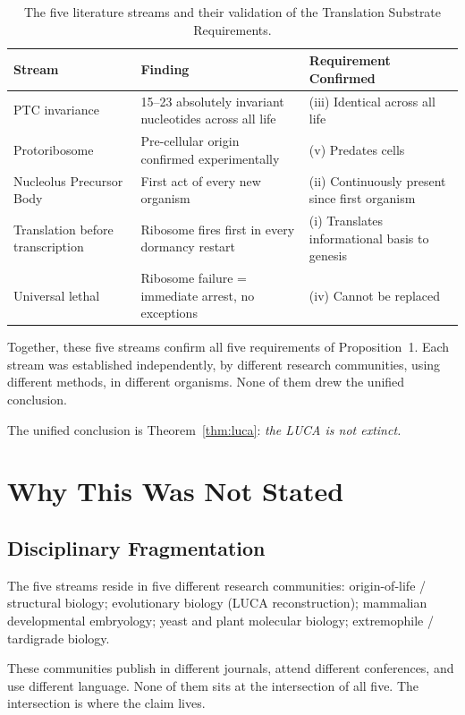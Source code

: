 \documentclass[11pt]{article}
\theoremstyle{definition}
\begin{document}
\begin{table}[h!]
\centering
\caption{The five literature streams and their validation
of the Translation Substrate Requirements.}
\label{tab:streams}
\begin{tabular}{p{4cm} p{5cm} p{4cm}}
\toprule
\textbf{Stream} & \textbf{Finding} & \textbf{Requirement Confirmed} \\
\midrule
PTC invariance
& 15--23 absolutely invariant nucleotides across all life
& (iii) Identical across all life \\
\addlinespace
Protoribosome
& Pre-cellular origin confirmed experimentally
& (v) Predates cells \\
\addlinespace
Nucleolus Precursor Body
& First act of every new organism
& (ii) Continuously present since first organism \\
\addlinespace
Translation before transcription
& Ribosome fires first in every dormancy restart
& (i) Translates informational basis to genesis \\
\addlinespace
Universal lethal
& Ribosome failure = immediate arrest, no exceptions
& (iv) Cannot be replaced \\
\bottomrule
\end{tabular}
\end{table}

Together, these five streams confirm all five requirements of
Proposition~1.
Each stream was established independently, by different research
communities, using different methods, in different organisms.
None of them drew the unified conclusion.

The unified conclusion is Theorem~\ref{thm:luca}:
\emph{the LUCA is not extinct.}

\section{Why This Was Not Stated}

\subsection{Disciplinary Fragmentation}

The five streams reside in five different research communities:
origin-of-life / structural biology;
evolutionary biology (LUCA reconstruction);
mammalian developmental embryology;
yeast and plant molecular biology;
extremophile / tardigrade biology.

These communities publish in different journals, attend different
conferences, and use different language.
None of them sits at the intersection of all five.
The intersection is where the claim lives.
\end{document}
